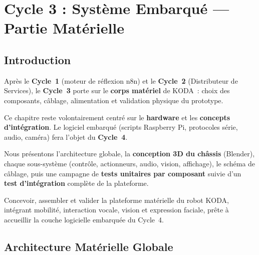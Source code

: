 \documentclass[a4paper,12pt]{report}
\begin{document}
	
	\chapter{Cycle 3 : Système Embarqué --- Partie Matérielle}
	
	\section{Introduction}
	
	Après le \textbf{Cycle~1} (moteur de réflexion n8n) et le \textbf{Cycle~2}
	(Distributeur de Services), le \textbf{Cycle~3} porte sur le
	\textbf{corps matériel} de KODA~: choix des composants, câblage, alimentation
	et validation physique du prototype.
	
	Ce chapitre reste volontairement centré sur le \textbf{hardware} et les
	\textbf{concepts d'intégration}. Le logiciel embarqué (scripts Raspberry Pi,
	protocoles série, audio, caméra) fera l'objet du \textbf{Cycle~4}.
	
	Nous présentons l'architecture globale, la \textbf{conception 3D du châssis}
	(Blender), chaque sous-système (contrôle, actionneurs, audio, vision,
	affichage), le schéma de câblage, puis une campagne de
	\textbf{tests unitaires par composant} suivie d'un \textbf{test d'intégration}
	complète de la plateforme.
	
	\begin{tcolorbox}[colback=blue!5!white, colframe=blue!60!black,
		title=\textbf{Objectif du Cycle 3}]
		Concevoir, assembler et valider la plateforme matérielle du robot KODA,
		intégrant mobilité, interaction vocale, vision et expression faciale,
		prête à accueillir la couche logicielle embarquée du Cycle~4.
	\end{tcolorbox}
	
	\section{Architecture Matérielle Globale}
	
\end{document}
